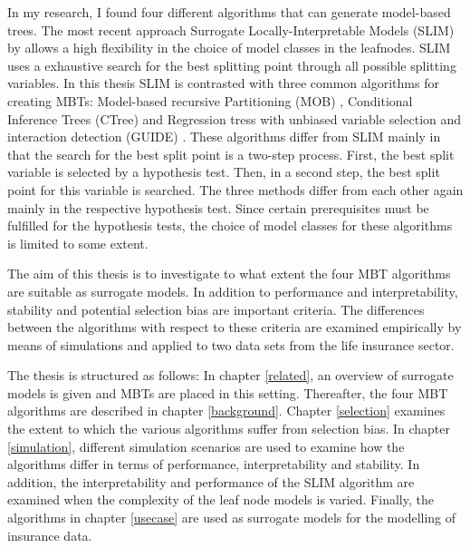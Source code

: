 In my research, I found four different algorithms that can generate model-based trees. 
The most recent approach Surrogate Locally-Interpretable Models (SLIM) by \cite{Hu.2020} allows a high flexibility in the choice of model classes in the leafnodes. SLIM uses a exhaustive search for the best splitting point through all possible splitting variables. 
In this thesis SLIM is contrasted with three common algorithms for creating MBTs: Model-based recursive Partitioning (MOB) \citep{Zeileis.2008}, Conditional Inference Trees (CTree) \citep{Hothorn.2006} and Regression tress with unbiased variable selection and interaction detection (GUIDE) \citep{Loh.2002}. These algorithms differ from SLIM mainly in that the search for the best split point is a two-step process. First, the best split variable is selected by a hypothesis test. Then, in a second step, the best split point for this variable is searched. The three methods differ from each other again mainly in the respective hypothesis test. Since certain prerequisites must be fulfilled for the hypothesis tests, the choice of model classes for these algorithms is limited to some extent.




The aim of this thesis is to investigate to what extent the four MBT algorithms are suitable as surrogate models. In addition to performance and interpretability, stability and potential selection bias are important criteria. The differences between the algorithms with respect to these criteria are examined empirically by means of simulations and applied to two data sets from the life insurance sector. 



The thesis is structured as follows:
In chapter \ref{related}, an overview of surrogate models is given and MBTs are placed in this setting. Thereafter, the four MBT algorithms are described in chapter \ref{background}. Chapter \ref{selection} examines the extent to which the various algorithms suffer from selection bias. In chapter \ref{simulation}, different simulation scenarios are used to examine how the algorithms differ in terms of performance, interpretability and stability. In addition, the interpretability and performance of the SLIM algorithm are examined when the complexity of the leaf node models is varied. Finally, the algorithms in chapter \ref{usecase} are used as surrogate models for the modelling of insurance data. 

